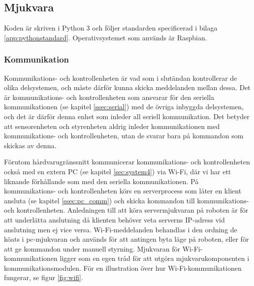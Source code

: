 \documentclass[a4paper,11pt]{article}
\begin{document}
\subsection{Mjukvara}
Koden är skriven i Python 3 och följer standarden specificerad i bilaga \ref{app:pythonstandard}. Operativsystemet som används är Raspbian.

\subsubsection{Kommunikation}\label{ssec:brain_comm}
Kommunikations- och kontrollenheten är vad som i slutändan kontrollerar de olika delsystemen, och måste därför kunna skicka meddelanden mellan dessa. Det är kommunikations- och kontrollenheten som ansvarar för den seriella kommunikationen (se kapitel \ref{ssec:serial}) med de övriga inbyggda delsystemen, och det är därför denna enhet som inleder all seriell kommunikation. Det betyder att sensorenheten och styrenheten aldrig inleder kommunikationen med kommunikations- och kontrollenheten, utan de svarar bara på kommandon som skickas av denna.

Förutom hårdvarugränssnitt kommunicerar  kommunikations- och kontrollenheten också med en extern PC (se kapitel \ref{sec:system4}) via Wi-Fi, där vi har ett liknande förhållande som med den seriella kommunikationen. På kommunikations- och kontrollenheten körs en serverprocess som låter en klient ansluta (se kapitel \ref{ssec:pc_comm}) och skicka kommandon till kommunikations- och kontrollenheten. Anledningen till att köra servermjukvaran på roboten är för att underlätta anslutning då klienten behöver veta serverns IP-adress vid anslutning men ej vice versa. Wi-Fi-meddelanden behandlas i den ordning de köats i pc-mjukvaran och används för att antingen byta läge på roboten, eller för att ge kommandon under manuell styrning. Mjukvaran för Wi-Fi-kommunikationen ligger som en egen tråd för att utgöra mjukvarukomponenten i kommunikationsmodulen. För en illustration över hur Wi-Fi-kommunikationen fungerar, se figur \ref{fig:wifi}.
\end{document}
